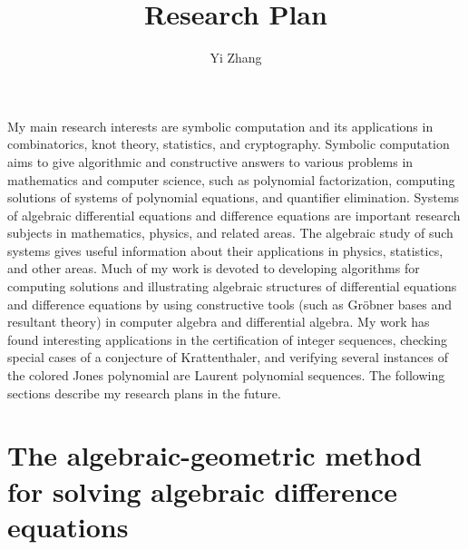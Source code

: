 \documentclass[10pt,a4paper]{article}
\begin{document}
\title{\bf{\Huge{Research Plan}}}

\author{Yi Zhang}



\date{}
\maketitle

My main research interests are symbolic computation and its applications in combinatorics, knot theory, statistics, 
and cryptography.  Symbolic computation aims to give algorithmic and constructive answers 
to various problems in mathematics and computer science, such as polynomial factorization, computing solutions of systems of polynomial equations, 
and quantifier elimination. Systems of algebraic differential equations and difference equations are important research subjects in mathematics, physics, and related areas. 
The algebraic study of such systems gives useful information about their applications in physics, statistics, and other areas. 
Much of my work is devoted to developing algorithms for  computing solutions and illustrating algebraic structures of differential equations and difference equations
by using constructive tools (such as Gr\"obner bases and resultant theory) in computer algebra and differential algebra. 
My work has found interesting applications in the certification of integer sequences, checking special cases of a conjecture of Krattenthaler, and verifying 
several instances of the colored Jones polynomial are Laurent polynomial sequences.  
The following sections describe my research plans in the future. 

\section*{The algebraic-geometric method for solving algebraic difference equations} \label{SECT:AODE}
\end{document}
